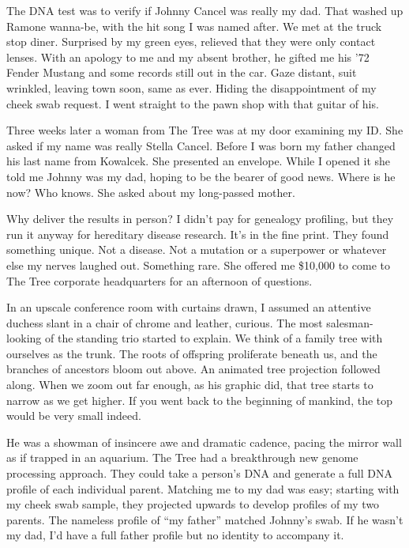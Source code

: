 
The DNA test was to verify if Johnny Cancel was really my dad. That
washed up Ramone wanna-be, with the hit song I was named after. We met
at the truck stop diner. Surprised by my green eyes, relieved that they
were only contact lenses. With an apology to me and my absent brother,
he gifted me his '72 Fender Mustang and some records still out in the
car. Gaze distant, suit wrinkled, leaving town soon, same as ever.
Hiding the disappointment of my cheek swab request. I went straight to
the pawn shop with that guitar of his.

Three weeks later a woman from The Tree was at my door examining my ID.
She asked if my name was really Stella Cancel. Before I was born my
father changed his last name from Kowalcek. She presented an envelope.
While I opened it she told me Johnny was my dad, hoping to be the bearer
of good news. Where is he now? Who knows. She asked about my long-passed
mother.

Why deliver the results in person? I didn't pay for genealogy profiling,
but they run it anyway for hereditary disease research. It's in the fine
print. They found something unique. Not a disease. Not a mutation or a
superpower or whatever else my nerves laughed out. Something rare. She
offered me \$10,000 to come to The Tree corporate headquarters for an
afternoon of questions.

\specscene

In an upscale conference room with curtains drawn, I assumed an
attentive duchess slant in a chair of chrome and leather, curious. The
most salesman-looking of the standing trio started to explain. We think
of a family tree with ourselves as the trunk. The roots of offspring
proliferate beneath us, and the branches of ancestors bloom out above.
An animated tree projection followed along. When we zoom out far enough,
as his graphic did, that tree starts to narrow as we get higher. If you
went back to the beginning of mankind, the top would be very small
indeed.

He was a showman of insincere awe and dramatic cadence, pacing the
mirror wall as if trapped in an aquarium. The Tree had a breakthrough
new genome processing approach. They could take a person's DNA and
generate a full DNA profile of each individual parent. Matching me to my
dad was easy; starting with my cheek swab sample, they projected upwards
to develop profiles of my two parents. The nameless profile of ``my
father'' matched Johnny's swab. If he wasn't my dad, I'd have a full
father profile but no identity to accompany it.

